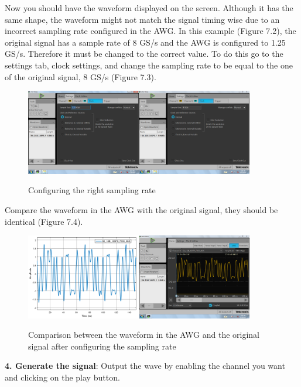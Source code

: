 Now you should have the waveform displayed on the screen. Although it has the same shape,  the waveform might not match the signal timing wise due to an incorrect sampling rate  configured in the AWG.
In this example (Figure 7.2), the original signal has a sample rate of 8 GS/s and the AWG is configured to 1.25 GS/s. Therefore it must be changed to the correct value.
To do this go to the settings tab, clock settings, and change the sampling rate to be equal to the one of the original signal, 8 GS/s (Figure 7.3).
\begin{figure}[h]
	\centering
	\includegraphics[width=10cm]{../mtools/sgnToWfm/figures/tutorial3}
	\label{TUT_ConfigSR}\caption{Configuring the right sampling rate}
\end{figure}
Compare the waveform in the AWG with the original signal, they should be identical (Figure 7.4).
\begin{figure}[h]
	\centering
	\includegraphics[width=10cm]{../mtools/sgnToWfm/figures/tutorial4}
	\label{TUT_CompGood}\caption{Comparison between the waveform in the AWG and the original signal after configuring the sampling rate}
\end{figure}
\bigskip

\noindent
\textbf{4. Generate the signal}:
Output the wave by enabling the channel you want and clicking on the play button.


% 